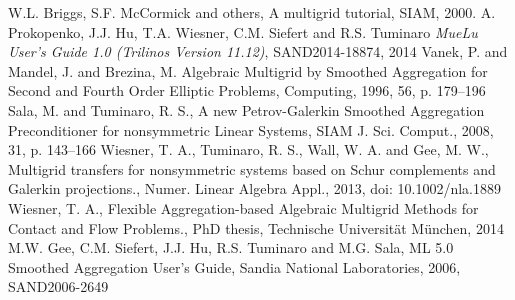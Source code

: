 \documentclass[10pt,fleqn]{book}
\begin{document}
\begin{thebibliography}{99}
 W.L. Briggs, S.F. McCormick and others, A multigrid tutorial, SIAM, 2000.
 A. Prokopenko, J.J. Hu, T.A. Wiesner, C.M. Siefert and R.S. Tuminaro \emph{MueLu User's Guide 1.0 (Trilinos Version 11.12)}, SAND2014-18874, 2014
 Vanek, P. and Mandel, J. and Brezina, M. Algebraic Multigrid by Smoothed Aggregation for Second and Fourth Order Elliptic Problems, Computing, 1996, 56, p. 179--196
 Sala, M. and Tuminaro, R. S., A new Petrov-Galerkin Smoothed Aggregation Preconditioner for nonsymmetric Linear Systems, SIAM J. Sci. Comput., 2008, 31, p. 143--166
 Wiesner, T. A., Tuminaro, R. S., Wall, W. A. and Gee, M. W., Multigrid transfers for nonsymmetric systems based on Schur complements and Galerkin projections., Numer. Linear Algebra Appl., 2013, doi: 10.1002/nla.1889
 Wiesner, T. A., Flexible Aggregation-based Algebraic Multigrid Methods for Contact and Flow Problems., PhD thesis, Technische Universit\"at M\"unchen, 2014
 M.W. Gee, C.M. Siefert, J.J. Hu, R.S. Tuminaro and M.G. Sala, ML 5.0 Smoothed Aggregation User's Guide, Sandia National Laboratories, 2006, SAND2006-2649
\end{thebibliography}
\end{document}
